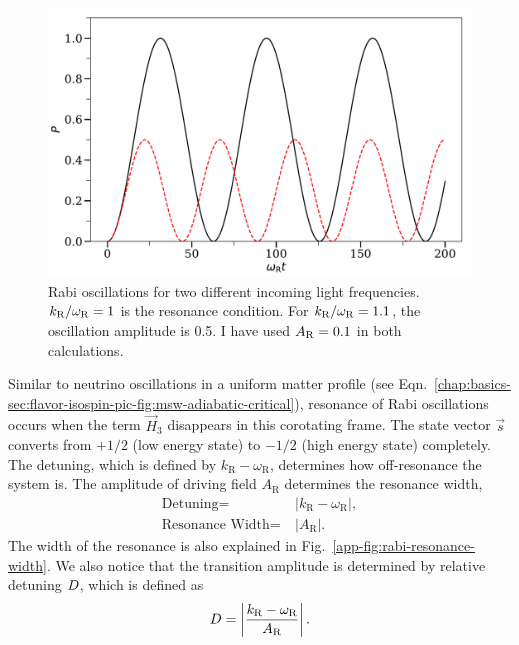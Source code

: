 \begin{figure}[htbp]
    \centering
    \includegraphics[width=\textwidth]{chapters/assets/app/rabi-oscillations}
    \caption{Rabi oscillations for two different incoming light frequencies. $k_\mathrm R/\omega_\mathrm R=1$ is the resonance condition. For $k_\mathrm R/\omega_\mathrm R=1.1$,  the oscillation amplitude is 0.5. I have used $A_\mathrm R=0.1$ in both calculations. }
    \label{app-fig:rabi-examples}
\end{figure}

Similar to neutrino oscillations in a uniform matter profile (see Eqn.~\ref{chap:basics-sec:flavor-isospin-pic-fig:msw-adiabatic-critical}), resonance of Rabi oscillations occurs when the term $\vec{H}_3$ disappears in this corotating frame. The state vector $\vec{s}$ converts from $+1/2$ (low energy state) to $-1/2$ (high energy state) completely. The detuning, which is defined by $k_{\mathrm{R}} - \omega_{\mathrm R}$, determines how off-resonance the system is. The amplitude of driving field $A_{\mathrm{R}}$ determines the resonance width,
\begin{align}
\text{Detuning} =&~\lvert k_{\mathrm{R}} - \omega_{\mathrm R} \rvert, \\
\text{Resonance Width} =&~\lvert A_{\mathrm R} \rvert.
\end{align}
The width of the resonance is also explained in Fig.~\ref{app-fig:rabi-resonance-width}. We also notice that the transition amplitude is determined by relative detuning $D$, which is defined as
\begin{equation}
    \RD = \left\lvert \frac{ k_{\mathrm R} - \omega_{\mathrm R}}{A_{\mathrm R}} \right\rvert.
    \label{chap:app-sec:rabi-oscillations-eqn:relative-detuning-def}
\end{equation}


